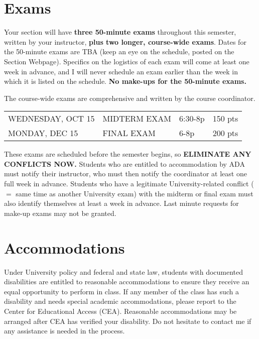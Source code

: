 \documentclass[margin,line,pifont,palatino,courier]{res}
\begin{document}
\begin{resume}
\section{\sc Exams} Your section will have {\bf three 50-minute exams} throughout this semester, written by your instructor, {\bf plus two longer, course-wide exams}.  Dates for the 50-minute exams are TBA (keep an eye on the schedule, posted on the Section Webpage).  Specifics on the logistics of each exam will come at least one week in advance, and I will never schedule an exam earlier than the week in which it is listed on the schedule.  {\bf No make-ups for the 50-minute exams.} 

The course-wide exams are comprehensive and written by the course coordinator.  

{\bf
\begin{tabular}{llll}
WEDNESDAY, OCT 15 & MIDTERM EXAM & 6:30-8p & 150 pts \\
MONDAY, DEC 15 & FINAL EXAM & 6-8p & 200 pts \\
\end{tabular} 
}

These exams are scheduled before the semester begins, so {\bf ELIMINATE ANY CONFLICTS NOW.} Students who are entitled to accommodation by ADA must notify their instructor, who must then notify the coordinator at least one full week in advance. Students who have a legitimate University-related conflict ($=$ same time as another University exam) with the midterm or final exam must also identify themselves at least a week in advance. Last minute requests for make-up exams may not be granted. 

\section{\sc Accommodations} Under University policy and federal and state law, students with documented disabilities are entitled to reasonable accommodations to ensure they receive an equal opportunity to perform in class.  If any member of the class has such a disability and needs special academic accommodations, please report to the Center for Educational Access (CEA).  Reasonable accommodations may be arranged after CEA has verified your disability.  Do not hesitate to contact me if any assistance is needed in the process.
 

\end{resume}
\end{document}
